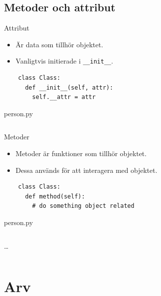 \subsection{Metoder och attribut}

\begin{frame}[fragile]
  \begin{block}{Attribut}
    \begin{itemize}
      \item Är data som tillhör objektet.
      \item Vanligtvis initierade i \texttt{__init__}.
    \end{itemize}
  \end{block}

  \begin{verbatim}
    class Class:
      def __init__(self, attr):
        self.__attr = attr
  \end{verbatim}
\end{frame}

\begin{frame}[fragile]
  person.py \hrulefill
  \inputminted[linenos,lastline=15]{python}{examples/person.py}
\end{frame}

\begin{frame}[fragile]
  \begin{block}{Metoder}
    \begin{itemize}
      \item Metoder är funktioner som tillhör objektet.
      \item Dessa används för att interagera med objektet.
    \end{itemize}
  \end{block}

  \begin{verbatim}
    class Class:
      def method(self):
        # do something object related
  \end{verbatim}
\end{frame}

\begin{frame}[fragile]
  person.py \hrulefill
  \inputminted[linenos,firstline=3,lastline=4]{python}{examples/person.py}
  \dots
  \inputminted[autogobble=false,linenos,firstline=16,lastline=23]{python}{examples/person.py}
\end{frame}


\section{Arv}

